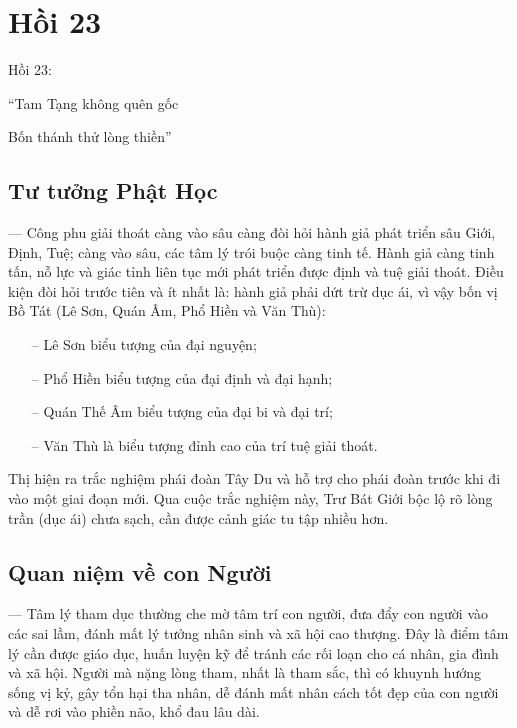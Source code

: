 \chapter{Hồi 23} %
\label{cha:hoi_23}

Hồi 23:

\begin{itshape}
``Tam Tạng không quên gốc

Bốn thánh thử lòng thiền''
\end{itshape}

\section{Tư tưởng Phật Học} %
\label{sec:23_phat_hoc}

— Công phu giải thoát càng vào sâu càng đòi hỏi hành giả phát triển sâu Giới, Định, Tuệ; càng vào sâu, các tâm lý trói buộc càng tinh tế. Hành giả càng tinh tấn, nỗ lực và giác tỉnh liên tục mới phát triển được định và tuệ giải thoát. Điều kiện đòi hỏi trước tiên và ít nhất là: hành giả phải dứt trừ dục ái, vì vậy bốn vị Bồ Tát (Lê Sơn, Quán Âm, Phổ Hiền và Văn Thù):

\begin{itemize}
   \item[–] Lê Sơn biểu tượng của đại nguyện;
   \item[–] Phổ Hiền biểu tượng của đại định và đại hạnh;
   \item[–] Quán Thế Âm biểu tượng của đại bi và đại trí;
   \item[–] Văn Thù là biểu tượng đỉnh cao của trí tuệ giải thoát.
\end{itemize}

Thị hiện ra trắc nghiệm phái đoàn Tây Du và hỗ trợ cho phái đoàn trước khi đi vào một giai đoạn mới. Qua cuộc trắc nghiệm này, Trư Bát Giới bộc lộ rõ lòng trần (dục ái) chưa sạch, cần được cảnh giác tu tập nhiều hơn.

\section{Quan niệm về con Người} %
\label{sec:23_con_nguoi}

— Tâm lý tham dục thường che mờ tâm trí con người, đưa đẩy con người vào các sai lầm, đánh mất lý tưởng nhân sinh và xã hội cao thượng. Đây là điểm tâm lý cần được giáo dục, huấn luyện kỹ để tránh các rối loạn cho cá nhân, gia đình và xã hội. Người mà nặng lòng tham, nhất là tham sắc, thì có khuynh hướng sống vị kỷ, gây tổn hại tha nhân, dễ đánh mất nhân cách tốt đẹp của con người và dễ rơi vào phiền não, khổ đau lâu dài.

